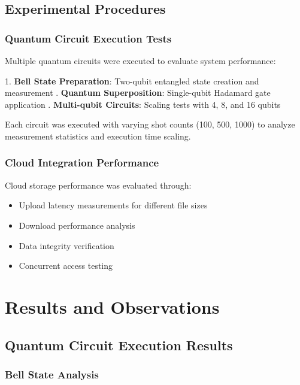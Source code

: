 \documentclass[onecolumn]{IEEEtran}
\begin{document}
\subsection{Experimental Procedures}

\subsubsection{Quantum Circuit Execution Tests}

Multiple quantum circuits were executed to evaluate system performance:

\begin{itemize}
    1. \textbf{Bell State Preparation}: Two-qubit entangled state creation and measurement 
    . \textbf{Quantum Superposition}: Single-qubit Hadamard gate application . \textbf{Multi-qubit Circuits}: Scaling tests with 4, 8, and 16 qubits
\end{itemize}
    
    
Each circuit was executed with varying shot counts (100, 500, 1000) to analyze measurement statistics and execution time scaling.

\subsubsection{Cloud Integration Performance}

Cloud storage performance was evaluated through:
\begin{itemize}
    \item Upload latency measurements for different file sizes
    \item Download performance analysis
    \item Data integrity verification
    \item Concurrent access testing
\end{itemize}

\section{Results and Observations}

\subsection{Quantum Circuit Execution Results}

\subsubsection{Bell State Analysis}
\end{document}
